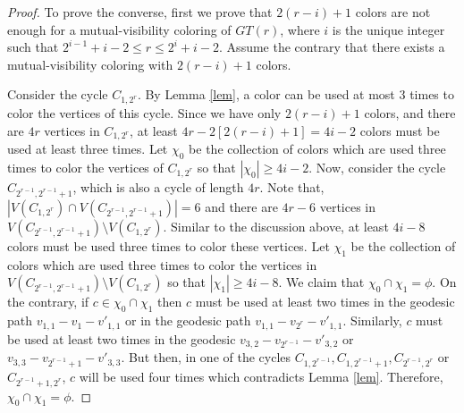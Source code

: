 \documentclass[12pt]{article}
\begin{document}
\begin{proof}
To prove the converse, first we prove that $2(r-i)+1$ colors are not enough for a mutual-visibility coloring of $GT(r)$, where $i$ is the unique integer such that $2^{i-1} + i-2 \leq r \leq 2^i+i-2$. Assume the contrary that there exists a mutual-visibility coloring with $2(r-i)+1$ colors.\par

Consider the cycle $C_{1,2^r}$. By Lemma \ref{lem}, a color can be used at most 3 times to color the vertices of this cycle. Since we have only $2(r-i)+1$ colors, and there are $4r$ vertices in $C_{1,2^r}$, at least $4r - 2[2(r-i)+1] = 4i-2$ colors must be used at least three times. Let $\chi_0$ be the collection of colors which are used three times to color the vertices of $C_{1,2^r}$ so that $|\chi_0|\geq4i-2$. Now, consider the cycle $C_{2^{r-1},2^{r-1}+1}$, which is also a cycle of length $4r$. Note that, $|V(C_{1,2^r}) \cap V(C_{2^{r-1},2^{r-1}+1})| = 6$ and there are $4r-6$ vertices in $V(C_{2^{r-1},2^{r-1}+1}) \setminus V(C_{1,2^r}) $. Similar to the discussion above, at least $4i - 8$ colors  must be used three times to color these vertices. Let $\chi_1$  be the collection of colors which are used three times to color the vertices in $V(C_{2^{r-1},2^{r-1}+1}) \setminus V(C_{1,2^r})$ so that $|\chi_1|\geq4i - 8$. We claim that $\chi_0  \cap \chi_1  = \phi$. On the contrary, if $c \in \chi_0  \cap \chi_1$ then $c$ must be used at least two times in the geodesic path $v_{1,1}-v_1-v'_{1,1}$ or in the geodesic path $v_{1,1}-v_{2^r}-v'_{1,1}$. Similarly, $c$ must be used at least two times in the geodesic $v_{3,2}-v_{2^{r-1}}-v'_{3,2}$ or $v_{3,3}-v_{2^{r-1}+1}-v'_{3,3}$. But then, in one of the cycles $C_{1,2^{r-1}}, C_{1,2^{r-1}+1}, C_{2^{r-1},2^r}$ or $C_{2^{r-1}+1,2^r}$, $c$ will be used four times which contradicts Lemma \ref{lem}. Therefore,$\chi_0  \cap \chi_1  = \phi$.



\end{proof}
\end{document}
